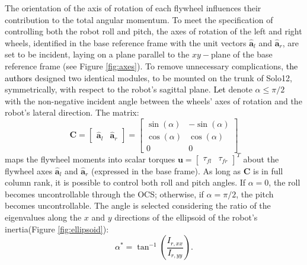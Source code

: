 \documentclass[sensors,article,accept,pdftex,moreauthors]{Definitions/mdpi}
\newcommand{\MF}[1]{\textcolor{black}{#1}}
\begin{document}
The orientation of the axis of rotation of each flywheel influences their contribution to the total angular momentum. To meet the specification of controlling both the robot roll and pitch, the axes of rotation of the left and right wheels, identified in the base reference frame with the unit vectors $\hat{\bm{a}}_l$ and $\hat{\bm{a}}_r$, are set to be incident, laying on a plane parallel to the $xy-$plane of the base reference frame (see Figure \ref{fig:axes}). 
To remove unnecessary complications, \MF{the authors} designed two identical modules, to be mounted on the trunk of Solo12, symmetrically, with respect to the robot's sagittal plane. \MF{Let} denote $\alpha \leq \pi/2$ with the non-negative incident angle between the wheels' axes of rotation and the robot's lateral direction. The matrix: 
\begin{equation}
\bm{C} = 
\left[ \begin{array}{cc}
\hat{\bm{a}}_l & \hat{\bm{a}}_r
\end{array} \right] = 
\left[ \begin{array}{cc}
\sin(\alpha) & -\sin(\alpha) \\
\cos(\alpha) & \cos(\alpha) \\
0 & 0
\end{array} \right]
\end{equation}
maps the flywheel moments into scalar torques $\bm{u} = \left[\begin{array}{cc} \tau_{fl} & \tau_{fr} \end{array} \right]^T$ about the flywheel axes $\hat{\bm{a}}_l$ and $\hat{\bm{a}}_r$ (expressed in the base frame).
As long as $\bm{C}$ is in full column rank, it is possible to control both roll and pitch angles. If $\alpha = 0$, the roll becomes uncontrollable through the OCS; otherwise, if $\alpha = \pi/2$, the pitch becomes uncontrollable. 
The angle is selected considering the ratio of the eigenvalues along the $x$ and $y$ directions of the ellipsoid of the robot's inertia(Figure \ref{fig:ellipsoid}):
\MF{\begin{equation}
\alpha^{*}=\tan^{-1}\left(\dfrac{I_{r, xx}}{I_{r, yy}}\right).
\end{equation}}
\end{document}
